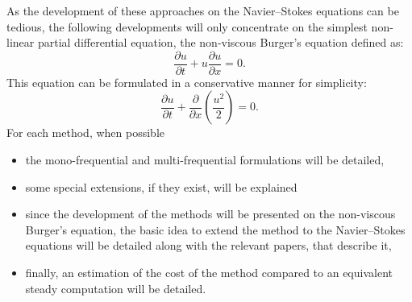 As the development of these approaches on the Navier--Stokes equations
can be tedious, the following developments 
will only concentrate on the simplest
non-linear partial differential equation, 
the non-viscous Burger's equation defined as:
\begin{equation}
  \frac{\partial u}{\partial t} + 
  u \frac{\partial u}{\partial x} = 
  0.
  \label{eq:sm_nonlinear_convection}
\end{equation}
This equation can be formulated in a conservative manner for simplicity:
\begin{equation}
  \frac{\partial u}{\partial t} + 
  \frac{\partial}{\partial x} \left( \frac{u^2}{2} \right) = 
  0.
  \label{eq:sm_nonlinear_convection_conservative}
\end{equation}
For each method, when possible
\begin{itemize} \itemsep0pt \parskip0pt
  \item the mono-frequential and multi-frequential 
  formulations will be detailed,
  \item some special extensions, if they exist, will be explained
  \item since the development of the methods will be 
  presented on the non-viscous 
  Burger's equation, 
  the basic idea to extend the method to the Navier--Stokes
  equations will be detailed along with the relevant papers,
  that describe it,
  \item finally, an estimation of the cost of the method 
  compared to an equivalent steady computation will be detailed.
\end{itemize}
